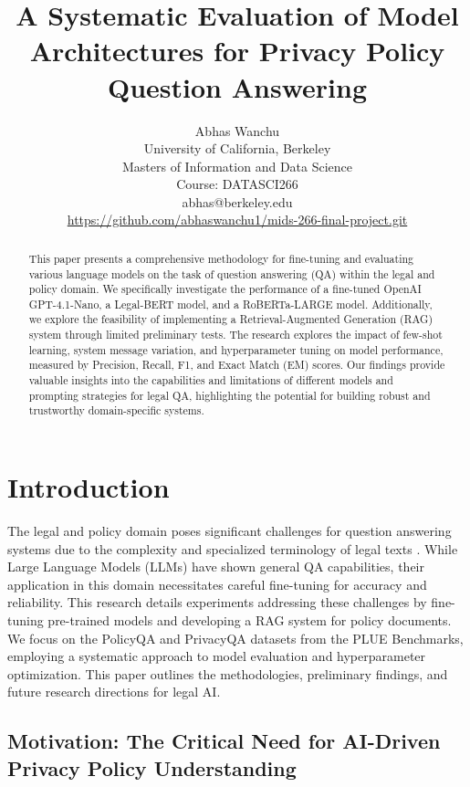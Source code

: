 \documentclass[11pt]{article}
\title{A Systematic Evaluation of Model Architectures for Privacy Policy Question Answering}
\author{Abhas Wanchu \\
  University of California, Berkeley\\
  Masters of Information and Data Science\\
  Course: DATASCI266\\
  abhas@berkeley.edu  \\
  \url{https://github.com/abhaswanchu1/mids-266-final-project.git}}
\begin{document}
\maketitle

\begin{abstract}
This paper presents a comprehensive methodology for fine-tuning and evaluating various language models on the task of question answering (QA) within the legal and policy domain. We specifically investigate the performance of a fine-tuned OpenAI GPT-4.1-Nano, a Legal-BERT model, and a RoBERTa-LARGE model. Additionally, we explore the feasibility of implementing a Retrieval-Augmented Generation (RAG) system through limited preliminary tests. The research explores the impact of few-shot learning, system message variation, and hyperparameter tuning on model performance, measured by Precision, Recall, F1, and Exact Match (EM) scores. Our findings provide valuable insights into the capabilities and limitations of different models and prompting strategies for legal QA, highlighting the potential for building robust and trustworthy domain-specific systems.
\end{abstract}

\section{Introduction}

The legal and policy domain poses significant challenges for question answering systems due to the complexity and specialized terminology of legal texts \cite{greco2023bringing, song2022effectiveness}. While Large Language Models (LLMs) have shown general QA capabilities, their application in this domain necessitates careful fine-tuning for accuracy and reliability. This research details experiments addressing these challenges by fine-tuning pre-trained models and developing a RAG system for policy documents. We focus on the PolicyQA \cite{ahmad2020policyqa} and PrivacyQA datasets from the PLUE \cite{chi2023plue} Benchmarks, employing a systematic approach to model evaluation and hyperparameter optimization. This paper outlines the methodologies, preliminary findings, and future research directions for legal AI.

\subsection{Motivation: The Critical Need for AI-Driven Privacy Policy Understanding}
\end{document}
